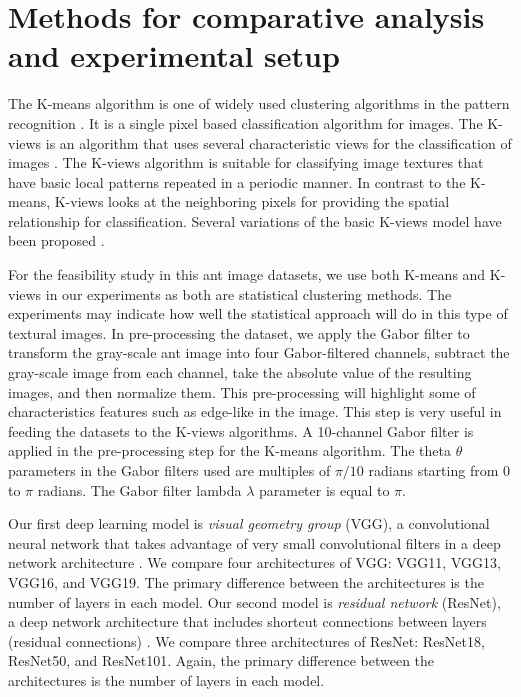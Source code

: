\documentclass{aci}
\numberwithin{equation}{section}
\begin{document}
\section{Methods for comparative analysis and experimental setup}


The K-means algorithm is one of widely used clustering algorithms in the pattern
recognition \cite{lloyd_least_1982}. It is a single pixel based classification
algorithm for images. The K-views is an algorithm that uses several
characteristic views for the classification of images \cite{hung_use_2002}. The
K-views algorithm is suitable for classifying image textures that have basic
local patterns repeated in a periodic manner. In contrast to the K-means,
K-views looks at the neighboring pixels for providing the spatial relationship
for classification.  Several variations of the basic K-views model have been
proposed \cite{yang_image_2003, lan_improved_2010}.

For the feasibility study in this ant image datasets, we use both K-means and
K-views in our experiments as both are statistical clustering methods. The
experiments may indicate how well the statistical approach will do in this type
of textural images. In pre-processing the dataset, we apply the Gabor filter to
transform the gray-scale ant image into four Gabor-filtered channels, subtract
the gray-scale image from each channel, take the absolute value of the resulting
images, and then normalize them. This pre-processing will highlight some of
characteristics features such as edge-like in the image. This step is very
useful in feeding the datasets to the K-views algorithms. A 10-channel Gabor
filter is applied in the pre-processing step for the K-means algorithm. The
theta $\theta$ parameters in the Gabor filters used are multiples of $\pi/10$
radians starting from $0$ to $\pi$ radians. The Gabor filter lambda $\lambda$
parameter is equal to $\pi$.


Our first deep learning model is \textit{visual geometry group} (VGG), a
convolutional neural network that takes advantage of very small convolutional
filters in a deep network architecture \cite{simonyan_very_2015}. We compare
four architectures of VGG: VGG11, VGG13, VGG16, and VGG19. The primary
difference between the architectures is the number of layers in each model. Our
second model is \textit{residual network} (ResNet), a deep network architecture
that includes shortcut connections between layers (residual connections)
\cite{he_deep_2015}. We compare three architectures of ResNet: ResNet18,
ResNet50, and ResNet101. Again, the primary difference between the architectures
is the number of layers in each model.
\end{document}

